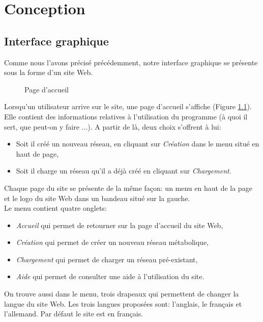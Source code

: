 \chapter{Conception}

\section{Interface graphique}

Comme nous l'avons précisé précédemment, notre interface graphique se présente sous la forme d'un site Web. 

\begin{figure}[!ht]
	\begin{center}
		\caption{Page d'accueil}
  		\label{main}
  	\end{center}	
\end{figure}

Lorsqu'un utilisateur arrive sur le site, une page d'accueil s'affiche (Figure \ref{main}). Elle contient des informations relatives à l'utilisation du programme (à quoi il sert, que peut-on y faire ...). A partir de là, deux choix s'offrent à lui:
\begin{itemize}
\item Soit il créé un nouveau réseau, en cliquant sur \emph{Création} dans le menu situé en haut de page,
\item Soit il charge un réseau qu'il a déjà créé en cliquant sur \emph{Chargement}.\\
\end{itemize}

Chaque page du site se présente de la m\^eme façon: un menu en haut de la page et le logo du site Web dans un bandeau situé sur la gauche.\\
Le menu contient quatre onglets:
\begin{itemize}
\item \emph{Accueil} qui permet de retourner sur la page d'accueil du site Web,
\item \emph{Création} qui permet de créer un nouveau réseau métabolique,
\item \emph{Chargement} qui permet de charger un réseau pré-existant,
\item \emph{Aide} qui permet de consulter une aide à l'utilisation du site.
\end{itemize}
On trouve aussi dans le menu, trois drapeaux qui permettent de changer la langue du site Web. Les trois langues proposées sont: l'anglais, le français et l'allemand. Par défaut le site est en français.


